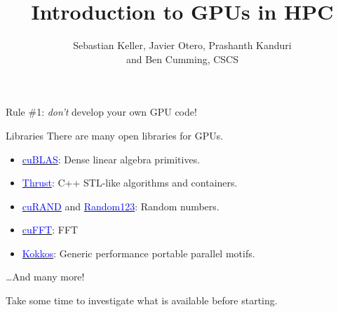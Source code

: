 \documentclass[aspectratio=43]{beamer}
\author{Sebastian Keller, Javier Otero, Prashanth Kanduri\\ and Ben Cumming, CSCS}
\title{Introduction to GPUs in HPC}
\subtitle{}
\begin{document}
\cscstitle


\begin{frame}[fragile]{}
    \centering
    Rule \#1: \emph{don't} develop your own GPU code!
\end{frame}

\begin{frame}[fragile]{Libraries}
    There are many open libraries for GPUs.
    \begin{itemize}
        \item \href{https://developer.nvidia.com/cublas}{\textcolor{blue}{cuBLAS}}: Dense linear algebra primitives.
        \item \href{https://developer.nvidia.com/thrust}{\textcolor{blue}{Thrust}}: C++ STL-like algorithms and containers.
        \item \href{https://developer.nvidia.com/thrust}{\textcolor{blue}{cuRAND}} and \href{http://www.thesalmons.org/john/random123/releases/latest/docs/}{\textcolor{blue}{Random123}}: Random numbers.
        \item \href{https://developer.nvidia.com/cufft}{\textcolor{blue}{cuFFT}}: FFT
        \item \href{https://github.com/kokkos/kokkos}{\textcolor{blue}{Kokkos}}: Generic performance portable parallel motifs.
    \end{itemize}
    \dots And many more!

    \vspace{1cm}

    Take some time to investigate what is available before starting.
\end{frame}
\end{document}
